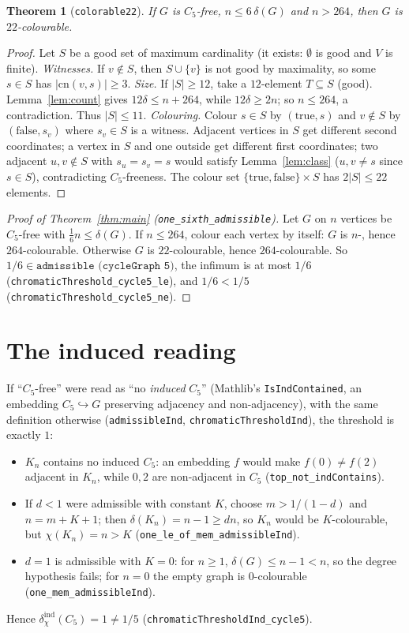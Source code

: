 \documentclass[11pt]{article}
\newtheorem{theorem}{Theorem}
\theoremstyle{definition}
\theoremstyle{remark}
\begin{document}
\begin{theorem}[\texttt{colorable22}]
If $G$ is $C_5$-free, $n\le 6\,\delta(G)$ and $n>264$, then $G$ is $22$-colourable.
\end{theorem}
\begin{proof}
Let $S$ be a good set of maximum cardinality (it exists: $\emptyset$ is good and $V$ is finite).
\emph{Witnesses.} If $v\notin S$, then $S\cup\{v\}$ is not good by maximality, so some $s\in S$ has
$|\mathrm{cn}(v,s)|\ge 3$.
\emph{Size.} If $|S|\ge 12$, take a $12$-element $T\subseteq S$ (good). Lemma~\ref{lem:count} gives
$12\delta\le n+264$, while $12\delta\ge 2n$; so $n\le 264$, a contradiction. Thus $|S|\le 11$.
\emph{Colouring.} Colour $s\in S$ by $(\mathrm{true},s)$ and $v\notin S$ by $(\mathrm{false},s_v)$ where $s_v\in S$
is a witness. Adjacent vertices in $S$ get different second coordinates; a vertex in $S$ and one outside get
different first coordinates; two adjacent $u,v\notin S$ with $s_u=s_v=s$ would satisfy Lemma~\ref{lem:class}
($u,v\ne s$ since $s\in S$), contradicting $C_5$-freeness. The colour set $\{\mathrm{true},\mathrm{false}\}\times S$
has $2|S|\le 22$ elements.
\end{proof}

\begin{proof}[Proof of Theorem~\ref{thm:main} (\texttt{one\_sixth\_admissible})]
Let $G$ on $n$ vertices be $C_5$-free with $\frac16 n\le\delta(G)$. If $n\le 264$, colour each vertex by itself:
$G$ is $n$-, hence $264$-colourable. Otherwise $G$ is $22$-colourable, hence $264$-colourable. So
$1/6\in\texttt{admissible (cycleGraph 5)}$, the infimum is at most $1/6$
(\texttt{chromaticThreshold\_cycle5\_le}), and $1/6<1/5$ (\texttt{chromaticThreshold\_cycle5\_ne}).
\end{proof}

\section{The induced reading}

If ``$C_5$-free'' were read as ``no \emph{induced} $C_5$'' (Mathlib's \texttt{IsIndContained}, an embedding
$C_5\hookrightarrow G$ preserving adjacency and non-adjacency), with the same definition otherwise
(\texttt{admissibleInd}, \texttt{chromaticThresholdInd}), the threshold is exactly $1$:
\begin{itemize}
\item $K_n$ contains no induced $C_5$: an embedding $f$ would make $f(0)\ne f(2)$ adjacent in $K_n$, while $0,2$ are
  non-adjacent in $C_5$ (\texttt{top\_not\_indContains}).
\item If $d<1$ were admissible with constant $K$, choose $m>1/(1-d)$ and $n=m+K+1$; then
  $\delta(K_n)=n-1\ge dn$, so $K_n$ would be $K$-colourable, but $\chi(K_n)=n>K$
  (\texttt{one\_le\_of\_mem\_admissibleInd}).
\item $d=1$ is admissible with $K=0$: for $n\ge1$, $\delta(G)\le n-1<n$, so the degree hypothesis fails; for $n=0$
  the empty graph is $0$-colourable (\texttt{one\_mem\_admissibleInd}).
\end{itemize}
Hence $\delta_\chi^{\mathrm{ind}}(C_5)=1\ne 1/5$ (\texttt{chromaticThresholdInd\_cycle5}).
\end{document}
